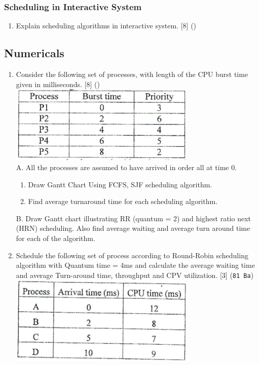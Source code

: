 \documentclass[12pt]{article}
\begin{document}
		\subsubsection{Scheduling in Interactive System}
			\begin{enumerate}[noitemsep, topsep = 0pt]
				\item Explain scheduling algorithms in interactive system. \hfill [8] ()
			\end{enumerate}

	\subsection{Numericals}
		\begin{enumerate}
			\item Consider the following set of processes, with length of the CPU burst time given in milliseconds. \hfill [8] ()\\
			\includegraphics[width=3.5in]{os_1}\\
			A. All the processes are assumed to have arrived in order all at time 0.
			\begin{enumerate}[noitemsep, topsep = 0pt, label = \alph*.]
				\item Draw Gantt Chart Using FCFS, SJF scheduling algorithm.
				\item Find average turnaround time for each scheduling algorithm.
			\end{enumerate}
			B. Draw Gantt chart illustrating RR (quantum = 2) and highest ratio next (HRN) scheduling. Also find average waiting and average turn around time for each of the algorithm.
			
			\item Schedule the following set of process according to Round-Robin scheduling algorithm with Quantum time = 4ms and calculate the average waiting time and average Turn-around time, throughput and CPV utilization. \hfill [3] (\texttt{81 Ba})\\
			\includegraphics[width=3.5in]{os_2}
			

\end{enumerate}
\end{document}

